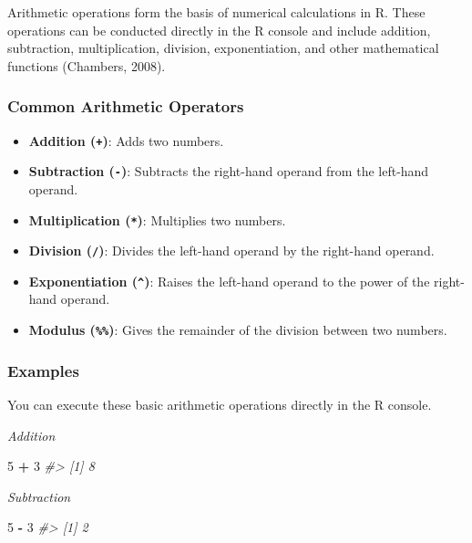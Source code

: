 \documentclass[
]{book}
\newenvironment{Shaded}{\begin{snugshade}}{\end{snugshade}}
\newcommand{\CommentTok}[1]{\textcolor[rgb]{0.56,0.35,0.01}{\textit{#1}}}
\newcommand{\DecValTok}[1]{\textcolor[rgb]{0.00,0.00,0.81}{#1}}
\newcommand{\SpecialCharTok}[1]{\textcolor[rgb]{0.81,0.36,0.00}{\textbf{#1}}}
\providecommand{\tightlist}{%
  \setlength{\itemsep}{0pt}\setlength{\parskip}{0pt}}
\begin{document}
Arithmetic operations form the basis of numerical calculations in R. These operations can be conducted directly in the R console and include addition, subtraction, multiplication, division, exponentiation, and other mathematical functions (Chambers, 2008).

\hypertarget{common-arithmetic-operators}{%
\subsubsection*{Common Arithmetic Operators}\label{common-arithmetic-operators}}

\begin{itemize}
\tightlist
\item
  \textbf{Addition (\texttt{+})}: Adds two numbers.
\item
  \textbf{Subtraction (\texttt{-})}: Subtracts the right-hand operand from the left-hand operand.
\item
  \textbf{Multiplication (\texttt{*})}: Multiplies two numbers.
\item
  \textbf{Division (\texttt{/})}: Divides the left-hand operand by the right-hand operand.
\item
  \textbf{Exponentiation (\texttt{\^{}})}: Raises the left-hand operand to the power of the right-hand operand.
\item
  \textbf{Modulus (\texttt{\%\%})}: Gives the remainder of the division between two numbers.
\end{itemize}

\hypertarget{examples}{%
\subsubsection*{Examples}\label{examples}}

You can execute these basic arithmetic operations directly in the R console.

\emph{Addition}

\begin{Shaded}
\begin{Highlighting}[]
\DecValTok{5} \SpecialCharTok{+} \DecValTok{3}
\CommentTok{\#\textgreater{} [1] 8}
\end{Highlighting}
\end{Shaded}

\emph{Subtraction}

\begin{Shaded}
\begin{Highlighting}[]
\DecValTok{5} \SpecialCharTok{{-}} \DecValTok{3}
\CommentTok{\#\textgreater{} [1] 2}
\end{Highlighting}
\end{Shaded}
\end{document}
